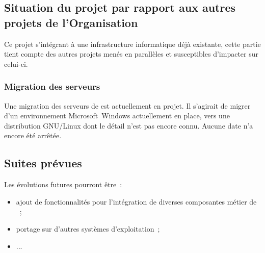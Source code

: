 \subsection{Situation du projet par rapport aux autres projets de l'Organisation}
Ce projet s'intégrant à une infrastructure informatique déjà existante, cette partie tient compte des autres projets menés en parallèles et susceptibles d'impacter sur celui-ci.

\subsubsection{Migration des serveurs}
Une migration des serveurs de \mo est actuellement en projet. Il s'agirait de migrer d'un environnement Microsoft~Windows actuellement en place, vers une distribution GNU/Linux dont le détail n'est pas encore connu. Aucune date n'a encore été arrêtée.



\subsection{Suites prévues}
Les évolutions futures pourront être~:
\begin{itemize}
	\item ajout de fonctionnalités pour l'intégration de diverses composantes métier de \mo~;
	\item portage sur d'autres systèmes d'exploitation~;
	\item ...
\end{itemize}

